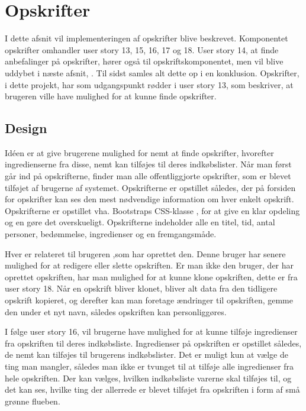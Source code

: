 \section{Opskrifter}
I dette afsnit vil implementeringen af opskrifter blive beskrevet. 
Komponentet opskrifter omhandler user story  13, 15, 16, 17 og 18.
User story  14, at finde anbefalinger på opskrifter, hører også til opskriftskomponentet, men vil blive uddybet i næste afsnit, . 
Til sidst samles alt dette op i en konklusion. 
Opskrifter, i dette projekt, har som udgangspunkt rødder i user story  13, som beskriver, at brugeren ville have mulighed for at kunne finde opskrifter.

\subsection{Design}
Idéen er at give brugerene mulighed for nemt at finde opskrifter, hvorefter ingredienserne fra disse, nemt kan tilføjes til deres indkøbslister.
Når man først går ind på opskrifterne, finder man alle offentliggjorte opskrifter, som er blevet tilføjet af brugerne af systemet.
Opskrifterne er opstillet således, der på forsiden for opskrifter kan ses den mest nødvendige information om hver enkelt opskrift.
Opskrifterne er opstillet vha. Bootstraps CSS-klasse , for at give en klar opdeling og en gøre det overskueligt.
Opskrifterne indeholder alle en titel, tid, antal personer, bedømmelse, ingredienser og en fremgangsmåde.

Hver  er relateret til brugeren ,som har oprettet den.
Denne bruger har senere mulighed for at redigere eller slette opskriften.
Er man ikke den bruger, der har oprettet opskriften, har man mulighed for at kunne klone opskriften, dette er fra user story  18.
Når en opskrift bliver klonet, bliver alt data fra den tidligere opskrift kopieret, og derefter kan man foretage ændringer til opskriften, gemme den under et nyt navn, således opskriften kan personliggøres.

I følge user story  16, vil brugerne have mulighed for at kunne tilføje ingredienser fra opskriften til deres indkøbsliste.
Ingredienser på opskriften er opstillet således, de nemt kan tilføjes til brugerens indkøbslister.
Det er muligt kun at vælge de ting man mangler, således man ikke er tvunget til at tilføje alle ingredienser fra hele opskriften.
Der kan vælges, hvilken indkøbsliste varerne skal tilføjes til, og det kan ses, hvilke ting der allerrede er blevet tilføjet fra opskriften i form af små grønne flueben.

